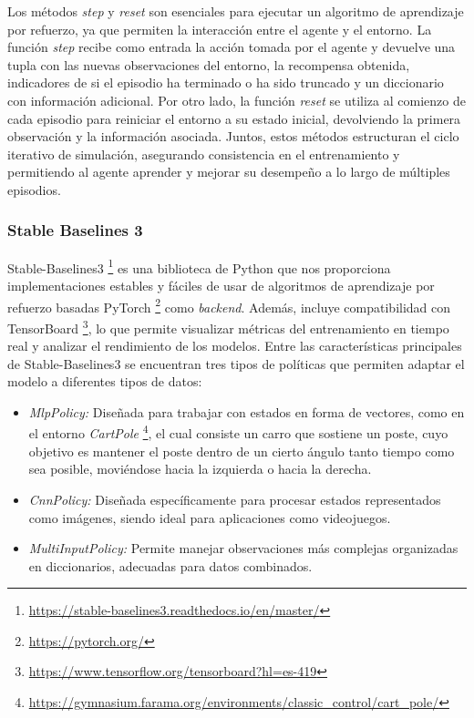 Los métodos \textit{step} y \textit{reset} son esenciales para ejecutar un algoritmo de aprendizaje por refuerzo, ya que permiten la interacción entre el agente y el entorno. La función \textit{step} recibe como entrada la acción tomada por el agente y devuelve una tupla con las nuevas observaciones del entorno, la recompensa obtenida, indicadores de si el episodio ha terminado o ha sido truncado y un diccionario con información adicional. Por otro lado, la función \textit{reset} se utiliza al comienzo de cada episodio para reiniciar el entorno a su estado inicial, devolviendo la primera observación y la información asociada. Juntos, estos métodos estructuran el ciclo iterativo de simulación, asegurando consistencia en el entrenamiento y permitiendo al agente aprender y mejorar su desempeño a lo largo de múltiples episodios.

\subsubsection{Stable Baselines 3}
\label{sec:stable_baselines3}

Stable-Baselines3 \footnote{\url{https://stable-baselines3.readthedocs.io/en/master/}} es una biblioteca de Python que nos proporciona implementaciones estables y fáciles de usar de algoritmos de aprendizaje por refuerzo basadas PyTorch \footnote{\url{https://pytorch.org/}} como \textit{backend}. Además, incluye compatibilidad con TensorBoard \footnote{\url{https://www.tensorflow.org/tensorboard?hl=es-419}}, lo que permite visualizar métricas del entrenamiento en tiempo real y analizar el rendimiento de los modelos. Entre las características principales de Stable-Baselines3 se encuentran tres tipos de políticas que permiten adaptar el modelo a diferentes tipos de datos:

 \begin{itemize} 
\item \textit{MlpPolicy:} Diseñada para trabajar con estados en forma de vectores, como en el entorno \textit{CartPole} \footnote{\url{https://gymnasium.farama.org/environments/classic_control/cart_pole/}}, el cual consiste un carro que sostiene un poste, cuyo objetivo es mantener el poste dentro de un cierto ángulo tanto tiempo como sea posible, moviéndose hacia la izquierda o hacia la derecha. 
\item \textit{CnnPolicy:} Diseñada específicamente para procesar estados representados como imágenes, siendo ideal para aplicaciones como videojuegos.
\item \textit{MultiInputPolicy:} Permite manejar observaciones más complejas organizadas en diccionarios, adecuadas para datos combinados. 
\end{itemize} 

